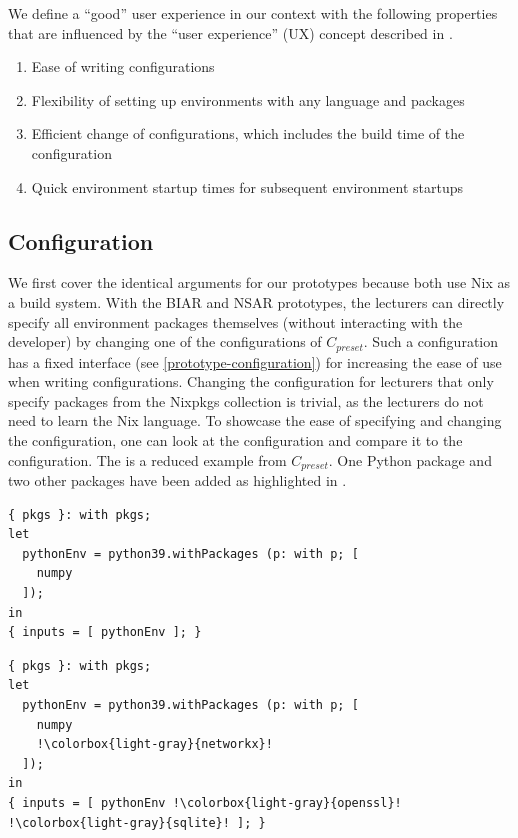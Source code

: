 We define a ``good'' user experience in our context with the following properties that are influenced by the ``user experience'' (UX) concept described in \cite{fagerholm2012}.
\begin{enumerate}
	\item Ease of writing configurations
	\item Flexibility of setting up environments with any language and packages
	\item Efficient change of configurations, which includes the build time of the configuration
	\item Quick environment startup times for subsequent environment startups
\end{enumerate}

\subsection{Configuration}\label{user-experience-config}
We first cover the identical arguments for our prototypes because both use Nix as a build system. With the BIAR and NSAR prototypes, the lecturers can directly specify all environment packages themselves (without interacting with the developer) by changing one of the configurations of $C_{preset}$. Such a configuration has a fixed interface (see \ref{prototype-configuration}) for increasing the ease of use when writing configurations. Changing the configuration for lecturers that only specify packages from the Nixpkgs collection is trivial, as the lecturers do not need to learn the Nix language. To showcase the ease of specifying and changing the configuration, one can look at the  configuration and compare it to the  configuration. The  is a reduced example from $C_{preset}$. One Python package and two other packages have been added as highlighted in .
\begin{lstlisting}[caption={preset-python.nix}, title={preset-python.nix}, label={preset-python.nix}]
{ pkgs }: with pkgs;
let
  pythonEnv = python39.withPackages (p: with p; [
    numpy
  ]);
in
{ inputs = [ pythonEnv ]; }
\end{lstlisting}
\begin{lstlisting}[caption={changed-python.nix}, title={changed-python.nix}, label={changed-python.nix}, escapechar=!]
{ pkgs }: with pkgs;
let
  pythonEnv = python39.withPackages (p: with p; [
    numpy
    !\colorbox{light-gray}{networkx}!
  ]);
in
{ inputs = [ pythonEnv !\colorbox{light-gray}{openssl}! !\colorbox{light-gray}{sqlite}! ]; }
\end{lstlisting}
